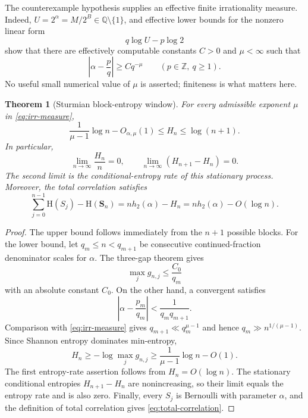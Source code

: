 \documentclass[11pt,oneside]{article}
\newtheorem{theorem}{Theorem}[section]
\theoremstyle{definition}
\theoremstyle{remark}
\newcommand{\Q}{\mathbb{Q}}
\newcommand{\Z}{\mathbb{Z}}
\newcommand{\HH}{\mathrm{H}}
\begin{document}
The counterexample hypothesis supplies an effective finite irrationality measure.  Indeed, $U=2^\alpha=M/2^B\in\Q\setminus\{1\}$, and effective lower bounds for the nonzero linear form \cite{Baker1975,Matveev2000}
\[
 q\log U-p\log2
\]
show that there are effectively computable constants $C>0$ and $\mu<\infty$ such that
\begin{equation}\label{eq:irr-measure}
 \left|\alpha-\frac pq\right|\geq Cq^{-\mu}
 \qquad(p\in\Z,\ q\geq1).
\end{equation}
No useful small numerical value of $\mu$ is asserted; finiteness is what matters here.

\begin{theorem}[Sturmian block-entropy window]\label{thm:block-entropy}
For every admissible exponent $\mu$ in \eqref{eq:irr-measure},
\begin{equation}\label{eq:block-window}
 \frac{1}{\mu-1}\log n-O_{\alpha,\mu}(1)
 \leq H_n\leq\log(n+1).
\end{equation}
In particular,
\begin{equation}\label{eq:entropy-rate-zero}
 \lim_{n\to\infty}\frac{H_n}{n}=0,
 \qquad
 \lim_{n\to\infty}(H_{n+1}-H_n)=0.
\end{equation}
The second limit is the conditional-entropy rate of this stationary process.
Moreover, the total correlation satisfies
\begin{equation}\label{eq:total-correlation}
 \sum_{j=0}^{n-1}\HH(S_j)-\HH(\mathbf S_n)
 =n h_2(\alpha)-H_n
 =n h_2(\alpha)-O(\log n).
\end{equation}
\end{theorem}

\begin{proof}
The upper bound follows immediately from the $n+1$ possible blocks.  For the lower bound, let $q_m\leq n<q_{m+1}$ be consecutive continued-fraction denominator scales for $\alpha$.  The three-gap theorem \cite{KuipersNiederreiter1974} gives
\begin{equation}\label{eq:max-gap}
 \max_j g_{n,j}\leq \frac{C_0}{q_m}
\end{equation}
with an absolute constant $C_0$.  On the other hand, a convergent satisfies
\[
 \left|\alpha-\frac{p_m}{q_m}\right|<\frac{1}{q_mq_{m+1}}.
\]
Comparison with \eqref{eq:irr-measure} gives $q_{m+1}\ll q_m^{\mu-1}$ and hence
$q_m\gg n^{1/(\mu-1)}$.  Since Shannon entropy dominates min-entropy,
\[
 H_n\geq-\log\max_jg_{n,j}
 \geq\frac1{\mu-1}\log n-O(1).
\]
The first entropy-rate assertion follows from $H_n=O(\log n)$.  The stationary conditional entropies $H_{n+1}-H_n$ are nonincreasing, so their limit equals the entropy rate and is also zero.  Finally, every $S_j$ is Bernoulli with parameter $\alpha$, and the definition of total correlation gives \eqref{eq:total-correlation}.
\end{proof}
\end{document}
